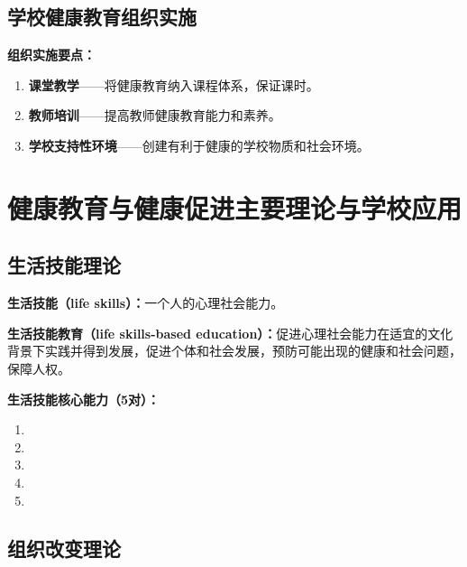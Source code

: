 \subsection{学校健康教育组织实施}

\begin{tipbox}
\textbf{组织实施要点：}

\begin{enumerate}[leftmargin=*]
    \item \textbf{课堂教学}——将健康教育纳入课程体系，保证课时。
    \item \textbf{教师培训}——提高教师健康教育能力和素养。
    \item \textbf{学校支持性环境}——创建有利于健康的学校物质和社会环境。
\end{enumerate}
\end{tipbox}

\section{健康教育与健康促进主要理论与学校应用}

\subsection{生活技能理论}

\begin{defbox}
\textbf{生活技能（life skills）：}一个人的心理社会能力。

\textbf{生活技能教育（life skills-based education）：}促进心理社会能力在适宜的文化背景下实践并得到发展，促进个体和社会发展，预防可能出现的健康和社会问题，保障人权。
\end{defbox}

\begin{keybox}
\textbf{生活技能核心能力（5对）：}

\begin{enumerate}[leftmargin=*]
    \item {}
    \item {}
    \item {}
    \item {}
    \item {}
\end{enumerate}
\end{keybox}

\subsection{组织改变理论}

